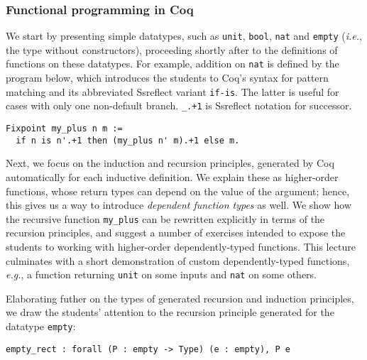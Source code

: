 \documentclass[blockstyle,preprint,nocopyrightspace]{sigplanconf}
\newcommand{\code}[1]{\lstinline{#1}}
\newcommand{\ie}{\emph{i.e.}\xspace}
\newcommand{\eg}{\emph{e.g.}\xspace}
\begin{document}
\subsubsection{Functional programming in Coq}
\label{sec:programming-coq}

We start by presenting simple datatypes, such as \code{unit},
\code{bool}, \code{nat} and \code{empty} (\ie, the type without
constructors), proceeding shortly after to the definitions of
functions on these datatypes. For example, addition on \code{nat} is
defined by the program below, which introduces the students to Coq's
syntax for pattern matching and its abbreviated Ssreflect variant
\code{if-is}. The latter is useful for cases with only one non-default
branch. \code{_.+1} is Ssreflect notation for successor.

\begin{lstlisting}
Fixpoint my_plus n m := 
  if n is n'.+1 then (my_plus n' m).+1 else m.
\end{lstlisting}

Next, we focus on the induction and recursion principles, generated by
Coq automatically for each inductive definition. We explain these as
higher-order functions, whose return types can depend on the value of
the argument; hence, this gives us a way to introduce \emph{dependent
  function types} as well. We show how the recursive function
\code{my_plus} can be rewritten explicitly in terms of the recursion
principles, and suggest a number of exercises intended to expose the
students to working with higher-order dependently-typed
functions. This lecture culminates with a short demonstration of
custom dependently-typed functions, \eg, a function returning
\code{unit} on some inputs and \code{nat} on some others.

Elaborating futher on the types of generated recursion and induction
principles, we draw the students' attention to the recursion principle
generated for the datatype \code{empty}:

\begin{lstlisting}
empty_rect : forall (P : empty -> Type) (e : empty), P e
\end{lstlisting}
\end{document}
